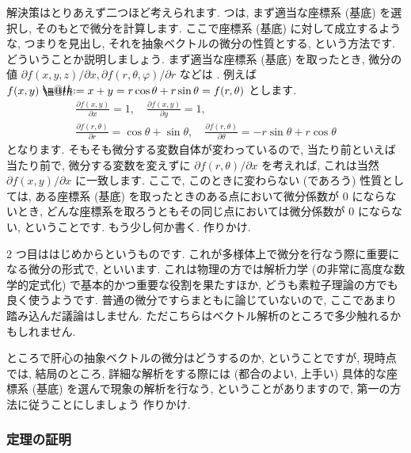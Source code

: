 \documentclass[openany, a4paper, oneside]{book}
\makeatletter
\newcommand*{\defeq}{\mathrel{\rlap{%
\raisebox{0.3ex}{$\m@th\cdot$}}%
\raisebox{-0.3ex}{$\m@th\cdot$}}%
=}
\theoremstyle{break}
\theoremstyle{breakdefn}
\makeatother
\begin{document}
解決策はとりあえず二つほど考えられます.
 つは, まず適当な座標系 (基底) を選択し, そのもとで微分を計算します.
ここで座標系 (基底) に対して成立するような,
つまりを見出し,
それを抽象ベクトルの微分の性質とする, という方法です.
どういうことか説明しましょう.
まず適当な座標系 (基底) を取ったとき, 微分の値
$\partial f (x ,y , z) / \partial x , \partial f (r , \theta, \varphi) / \partial r$ などは
.
例えば $f (x, y) \defeq x + y = r \cos \theta + r \sin \theta = f ( r, \theta)$ とします.
\begin{gather}
 \frac{\partial  f ( x, y )} { \partial  x }
 =
 1, \quad
 \frac{\partial f ( x, y ) } { \partial  y }
 =
 1, \\
 \frac{\partial f (r, \theta )} { \partial r }
 =
 \cos \theta + \sin \theta, \quad
 \frac{\partial f (r, \theta )} { \partial \theta }
 =
 -r \sin \theta + r \cos \theta
\end{gather}
となります.
そもそも微分する変数自体が変わっているので, 当たり前といえば当たり前で,
微分する変数を変えずに $\partial f (r , \theta) / \partial x$ を考えれば, これは当然
 $\partial f ( x , y) / \partial x$ に一致します.
ここで, このときに変わらない (であろう) 性質としては,
ある座標系 (基底) を取ったときのある点において微分係数が $0$ にならないとき,
どんな座標系を取ろうともその同じ点においては微分係数が $0$ にならない, ということです.
もう少し何か書く. 作りかけ.

2 つ目ははじめからというものです.
これが多様体上で微分を行なう際に重要になる微分の形式で,
といいます.
これは物理の方では解析力学 (の非常に高度な数学的定式化) で基本的かつ重要な役割を果たすほか,
どうも素粒子理論の方でも良く使うようです.
普通の微分ですらまともに論じていないので, ここであまり踏み込んだ議論はしません.
ただこちらはベクトル解析のところで多少触れるかもしれません.

ところで肝心の抽象ベクトルの微分はどうするのか, ということですが,
現時点では, 結局のところ, 詳細な解析をする際には
(都合のよい, 上手い) 具体的な座標系 (基底) を選んで現象の解析を行なう,
ということがありますので,
第一の方法に従うことにしましょう
作りかけ.
\subsubsection{定理の証明}
\label{sec-4-3-2-3-6}
\end{document}
